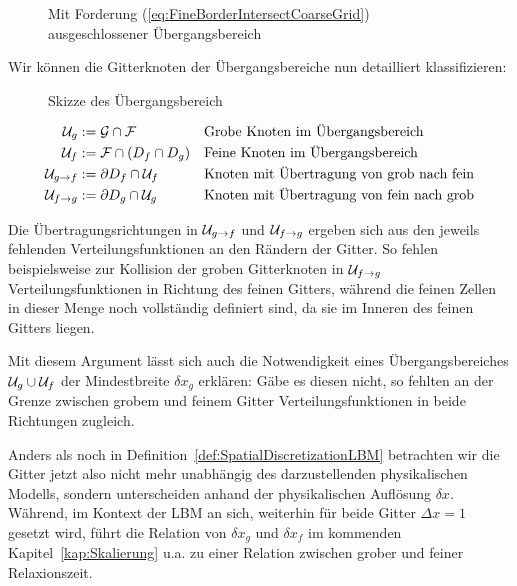 \begin{figure}[h]
\centering

\caption{Mit Forderung (\ref{eq:FineBorderIntersectCoarseGrid}) ausgeschlossener Übergangsbereich \cite[vgl. Abb.~9]{lagrava12}}
\label{fig:InvalidOverlapArea}
\end{figure}

\noindent
Wir können die Gitterknoten der Übergangsbereiche nun detailliert klassifizieren:

\begin{figure}[h]
\centering

\caption{Skizze des Übergangsbereich \cite[vgl.~Abb.~4]{lagrava12}}
\label{fig:OverlapZone}
\end{figure}

\begin{Definition}
\label{def:OverlapGridNodes}
\begin{align*}
\mathcal{U}_g &:= \mathcal{G} \cap \mathcal{F} && \text{Grobe Knoten im Übergangsbereich} \\
\mathcal{U}_f &:= \mathcal{F} \cap (D_f \cap D_g) && \text{Feine Knoten im Übergangsbereich} \\
\mathcal{U}_{g \to f} &:= \partial D_f \cap \mathcal{U}_f && \text{Knoten mit Übertragung von grob nach fein} \\
\mathcal{U}_{f \to g} &:= \partial D_g \cap \mathcal{U}_g && \text{Knoten mit Übertragung von fein nach grob}
\end{align*}
\end{Definition}

Die Übertragungsrichtungen in \(\mathcal{U}_{g \to f}\) und \(\mathcal{U}_{f \to g}\) ergeben sich aus den jeweils fehlenden Verteilungsfunktionen an den Rändern der Gitter. So fehlen beispielsweise zur Kollision der groben Gitterknoten in \(\mathcal{U}_{f \to g}\) Verteilungsfunktionen in Richtung des feinen Gitters, während die feinen Zellen in dieser Menge noch vollständig definiert sind, da sie im Inneren des feinen Gitters liegen.

Mit diesem Argument lässt sich auch die Notwendigkeit eines Übergangsbereiches \(\mathcal{U}_g \cup \mathcal{U}_f\) der Mindestbreite \(\delta x_g\) erklären: Gäbe es diesen nicht, so fehlten an der Grenze zwischen grobem und feinem Gitter Verteilungsfunktionen in beide Richtungen zugleich.

\bigskip
Anders als noch in Definition~\ref{def:SpatialDiscretizationLBM} betrachten wir die Gitter jetzt also nicht mehr unabhängig des darzustellenden physikalischen Modells, sondern unterscheiden anhand der physikalischen Auflösung \(\delta x\). Während, im Kontext der LBM an sich, weiterhin für beide Gitter \(\Delta x = 1\) gesetzt wird, führt die Relation von \(\delta x_g\) und \(\delta x_f\) im kommenden Kapitel~\ref{kap:Skalierung} u.a. zu einer Relation zwischen grober und feiner Relaxionszeit.

